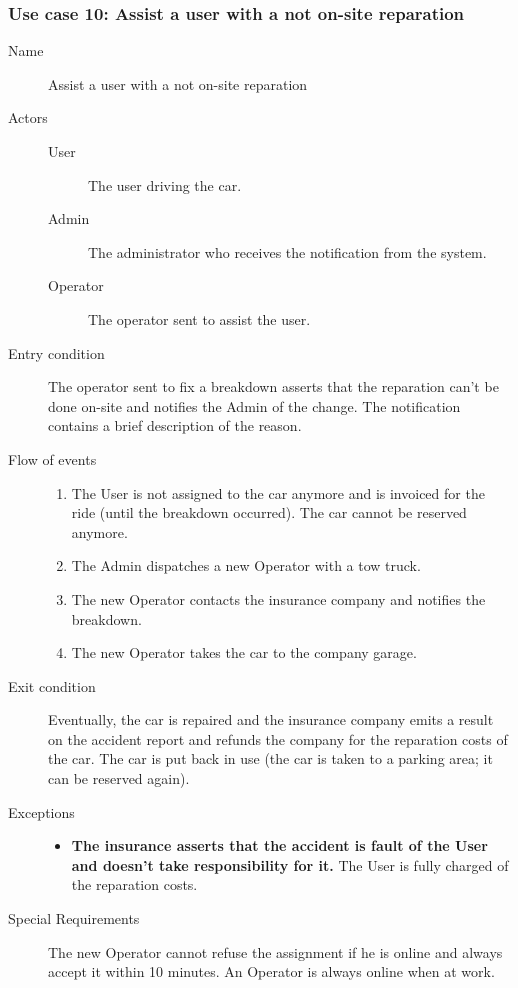 	\subsubsection{Use case 10: Assist a user with a not on-site reparation}
		\begin{description}
			\item[Name] Assist a user with a not on-site reparation
			\item[Actors] \hfill
			\begin{description}
				\item[User] The user driving the car.
				\item[Admin] The administrator who receives the notification from the system.
				\item[Operator] The operator sent to assist the user.
			\end{description}
			\item[Entry condition] The operator sent to fix a breakdown asserts that the reparation can't be done on-site and notifies the Admin of the change. The notification contains a brief description of the reason.
			\item[Flow of events] \hfill
			\begin{enumerate}
				\item The User is not assigned to the car anymore and is invoiced for the ride (until the breakdown occurred). The car cannot be reserved anymore.
				\item The Admin dispatches a new Operator with a tow truck.
				\item The new Operator contacts the insurance company and notifies the breakdown.
				\item The new Operator takes the car to the company garage.
			\end{enumerate}
			\item[Exit condition] Eventually, the car is repaired and the insurance company emits a result on the accident report and refunds the company for the reparation costs of the car. The car is put back in use (the car is taken to a parking area; it can be reserved again).
			\item[Exceptions] \hfill
			\begin{itemize}
				\item \textbf{The insurance asserts that the accident is fault of the User and doesn't take responsibility for it.} The User is fully charged of the reparation costs.
			\end{itemize}
			\item[Special Requirements] The new Operator cannot refuse the assignment if he is online and always accept it within 10 minutes. An Operator is always online when at work. %
		\end{description}

